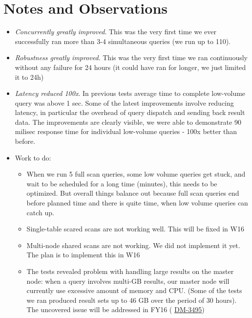 \documentclass[DM,toc]{lsstdoc}
\begin{document}
\section{Notes and Observations}\label{notes-and-observations}

\begin{itemize}
\item
  \emph{Concurrently greatly improved}. This was the very first time we
  ever successfully ran more than 3-4 simultaneous queries (we run up to
  110).
\item
  \emph{Robustness greatly improved}. This was the very first time we
  ran continuously without any failure for 24 hours (it could have ran
  for longer, we just limited it to 24h)
\item
  \emph{Latency reduced 100x}. In previous tests average time to
  complete low-volume query was above 1 sec. Some of the latest
  improvements involve reducing latency, in particular the overhead of
  query dispatch and sending back result data. The improvements are
  clearly visible, we were able to demonstrate 90 milisec response time
  for individual low-volume queries - 100x better than before.
\item
  Work to do:

  \begin{itemize}
  \item
    When we run 5 full scan queries, some low volume queries get stuck,
    and wait to be scheduled for a long time (minutes), this needs to be
    optimized. But overall things balance out because full scan queries
    end before planned time and there is quite time, when low volume
    queries can catch up.
  \item
    Single-table scared scans are not working well. This will be fixed
    in W16
  \item
    Multi-node shared scans are not working. We did not implement it
    yet. The plan is to implement this in W16
  \item
    The tests revealed problem with handling large results on the master
    node: when a query involves multi-GB results, our master node will
    currently use excessive amount of memory and CPU. (Some of the tests
    we ran produced result sets up to 46 GB over the period of 30
    hours). The uncovered issue will be addressed in FY16 (%
    \href{https://jira.lsstcorp.org/browse/DM-3495}{DM-3495})~
  \end{itemize}
\end{itemize}
\end{document}
